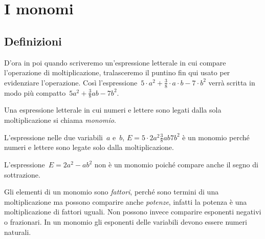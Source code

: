 

\section{I monomi}
\label{sec:09_monomi}

\subsection{Definizioni}
\label{subsec:09_monomi_definizioni}

D'ora in poi quando scriveremo un'espressione letterale in cui compare
l'operazione di moltiplicazione, tralasceremo il puntino fin qui usato per evidenziare l'operazione.
Così l'espressione~$5\cdot a^{2}+\frac{3}{8}\cdot a\cdot b-7\cdot b^{2}$ verrà scritta in modo
più compatto~$5a^{2}+\frac{3}{8}ab-7b^{2}$.

\begin{definizione}
Una espressione letterale in cui numeri e lettere sono legati dalla sola moltiplicazione si chiama \emph{monomio}.
\end{definizione}

\begin{exrig}
 \begin{esempio}
L'espressione nelle due variabili~$a$ e~$b$, $E=5\cdot 2a^{2}\frac{3}{8}ab7b^{2}$
è un monomio perché numeri e lettere sono legate solo dalla moltiplicazione.
 \end{esempio}

 \begin{esempio}
L'espressione~$E=2a^{2}-ab^{2}$ non è un monomio poiché compare anche il segno di sottrazione.
 \end{esempio}
\end{exrig}


\osservazione
Gli elementi di un monomio sono \emph{fattori}, perché sono termini
di una moltiplicazione ma possono comparire anche \emph{potenze},
infatti la potenza è una moltiplicazione di fattori uguali. Non
possono invece comparire esponenti negativi o frazionari. In un monomio
gli esponenti delle variabili devono essere numeri naturali.

